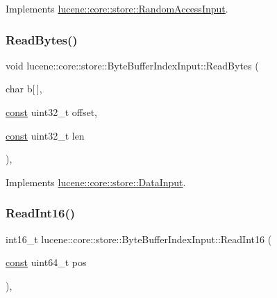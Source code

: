Implements \mbox{\hyperlink{classlucene_1_1core_1_1store_1_1RandomAccessInput_a3fede3f69a074b11632ad0d07c7bf19f}{lucene\+::core\+::store\+::\+Random\+Access\+Input}}.

\mbox{\label{classlucene_1_1core_1_1store_1_1ByteBufferIndexInput_abb72a44fc806fafc529b92d953b0007b}} 
\subsubsection{\texorpdfstring{Read\+Bytes()}{ReadBytes()}}
{\footnotesize\ttfamily void lucene\+::core\+::store\+::\+Byte\+Buffer\+Index\+Input\+::\+Read\+Bytes (\begin{DoxyParamCaption}\item[{char}]{b\mbox{[}$\,$\mbox{]},  }\item[{\mbox{\hyperlink{ZlibCrc32_8h_a2c212835823e3c54a8ab6d95c652660e}{const}} uint32\+\_\+t}]{offset,  }\item[{\mbox{\hyperlink{ZlibCrc32_8h_a2c212835823e3c54a8ab6d95c652660e}{const}} uint32\+\_\+t}]{len }\end{DoxyParamCaption})\hspace{0.3cm}{\ttfamily [inline]}, {\ttfamily [virtual]}}



Implements \mbox{\hyperlink{classlucene_1_1core_1_1store_1_1DataInput_aa5f24102b9b50a190bcb7a8edb82ea2d}{lucene\+::core\+::store\+::\+Data\+Input}}.

\mbox{\label{classlucene_1_1core_1_1store_1_1ByteBufferIndexInput_a8fdaba5ee8b09349dfb85413ec683dad}} 
\subsubsection{\texorpdfstring{Read\+Int16()}{ReadInt16()}}
{\footnotesize\ttfamily int16\+\_\+t lucene\+::core\+::store\+::\+Byte\+Buffer\+Index\+Input\+::\+Read\+Int16 (\begin{DoxyParamCaption}\item[{\mbox{\hyperlink{ZlibCrc32_8h_a2c212835823e3c54a8ab6d95c652660e}{const}} uint64\+\_\+t}]{pos }\end{DoxyParamCaption})\hspace{0.3cm}{\ttfamily [inline]}, {\ttfamily [virtual]}}



